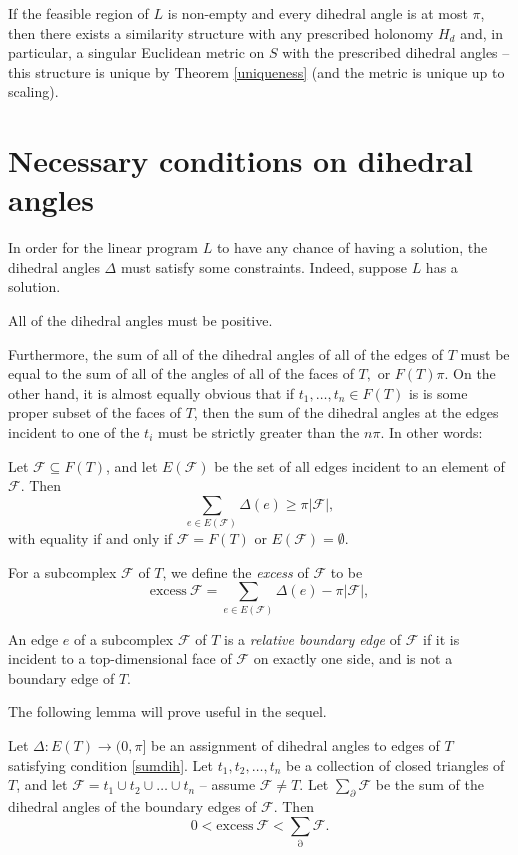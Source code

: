 \documentclass{acmart}
\newcommand{\thm}[2]{\begin{#1} #2 \end{#1}}
\newcommand{\excess}{\mathrm{excess\:}}
\begin{document}
\thm{theorem}
{
\label{exist}
If the feasible region of $L$ is non-empty and every dihedral angle
is at most $\pi$, then there exists a similarity structure with any
prescribed holonomy $H_d$  and, in particular, a singular Euclidean metric on
$S$ with the prescribed dihedral angles -- this structure is unique
by Theorem \ref{uniqueness} (and the metric is unique up to scaling).
}

\section{Necessary conditions on dihedral angles}
\label{necessary}

In order for the linear program $L$ to have any chance of having
a solution, the dihedral angles $\Delta$ must satisfy some constraints.
Indeed, suppose $L$ has a solution. 
\thm{condition}
{
\label{dihpos}
All of the dihedral angles must be positive. 
}
Furthermore, the sum of all of the
dihedral angles of all of the edges of $T$ must be equal to the
sum of all of the angles of all of the faces of $T,$ or $F(T) \pi$.
On the other
hand, it is almost equally obvious that if $t_1, \dots, t_n \in F(T)$
is is some proper subset of the faces of $T$, then the sum of the
dihedral angles at the edges incident to one of the $t_i$ must be
strictly greater than the $n \pi$. In other words:

\thm{condition}
{
\label{sumdih}
Let $\mathcal{F} \subseteq F(T)$, and let $E(\mathcal{F})$ be the set
of all edges incident to an element of $\mathcal{F}$. Then  
\begin{equation}
\label{sumdihineq}
\sum_{e\in E(\mathcal{F})} \Delta(e)\geq \pi |\mathcal{F}|,
\end{equation}
with equality if and only if $\mathcal{F} = F(T)$ or
$E(\mathcal{F})=\emptyset.$
}

\thm{definition}
{
For a subcomplex $\mathcal{F}$ of $T$, we define the \emph{excess} of
$\mathcal{F}$ to be 
$$
\excess \mathcal{F} = \sum_{e\in E(\mathcal{F})} \Delta(e) - \pi |\mathcal{F}|,
$$
}

\thm{definition}
{
An edge $e$ of a subcomplex $\mathcal{F}$ of $T$ is a \emph{relative
boundary edge} of $\mathcal{F}$ if it is incident to a
top-dimensional face of $\mathcal{F}$ on exactly one side, and is not
a boundary edge of $T$.
}

The following lemma will prove useful in the sequel.

\thm{lemma}
{
\label{boundaryineq}
Let $\Delta: E(T) \rightarrow (0, \pi ]$ be an assignment of dihedral
angles to edges of $T$ satisfying condition \ref{sumdih}. 
Let $t_1, t_2, \ldots, t_n$ be a collection of closed triangles of $T$, and
let $\mathcal{F} = t_1 \cup t_2 \cup \ldots \cup t_n$ -- assume
$\mathcal{F} \neq T$. Let
$\sum_\partial \mathcal{F}$ be the sum of the dihedral angles of the
boundary edges of $\mathcal{F}$. Then
\begin{equation}
\label{doublebd}
0 < \excess \mathcal{F} < \sum_\partial \mathcal{F}.
\end{equation}
}
\end{document}
